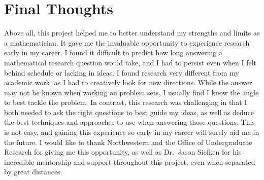 \documentclass[12pt,letterpaper]{article}
\begin{document}
\section*{Final Thoughts}
Above all, this project helped me to better understand my strengths and limits as a mathematician. It
gave me the invaluable opportunity to experience research early in my career. I found it difficult to
predict how long answering a mathematical research question would take, and I had to persist even when I
felt behind schedule or lacking in ideas. I found research very different from my academic work, as I
had to creatively look for new directions. While the answer may not be known when working on problem
sets, I usually find I know the angle to best tackle the problem. In contrast, this research was
challenging in that I both needed to ask the right questions to best guide my ideas, as well as deduce
the best techniques and approaches to use when answering those questions. This is not easy, and gaining
this experience so early in my career will surely aid me in the future. I would like to thank
Northwestern and the Office of Undergraduate Research for giving me this opportunity, as well as
Dr.~Jason Siefken for his incredible mentorship and support throughout this project, even when separated
by great distances.
\end{document}
